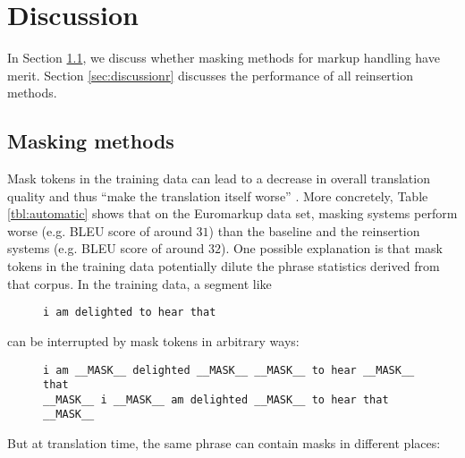 \documentclass[11pt,letterpaper]{article}
\begin{document}
\section{Discussion}


In Section \ref{sec:discussionm}, we discuss whether masking methods for markup handling have merit. Section \ref{sec:discussionr} discusses the performance of all reinsertion methods.

\subsection{Masking methods} \label{sec:discussionm}

Mask tokens in the training data can lead to a decrease in overall translation quality and thus ``make the translation itself worse'' \cite[78]{joanis2013transferring}. More concretely, Table \ref{tbl:automatic} shows that on the Euromarkup data set, masking systems perform worse (e.g. BLEU score of around $31$) than the baseline and the reinsertion systems (e.g. BLEU score of around $32$). One possible explanation is that mask tokens in the training data potentially dilute the phrase statistics derived from that corpus. In the training data, a segment like

\begin{figure}[h]
\texttt{i am delighted to hear that}
\end{figure}

\noindent can be interrupted by mask tokens in arbitrary ways:


\begin{figure}[h]
\texttt{i am \_\_MASK\_\_ delighted \_\_MASK\_\_  \_\_MASK\_\_  to hear \_\_MASK\_\_  that} \\

\texttt{\_\_MASK\_\_  i \_\_MASK\_\_  am delighted \_\_MASK\_\_  to hear that \_\_MASK\_\_}
\end{figure}

\noindent But at translation time, the same phrase can contain masks in different places:
\end{document}
